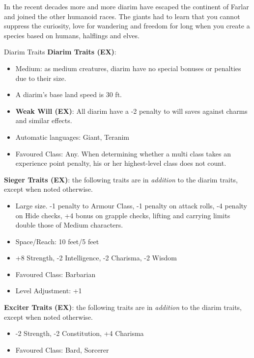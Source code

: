 In the recent decades more and more diarim have escaped the continent of
Farlar and joined the other humanoid races. The giants had to learn that you
cannot suppress the curiosity, love for wandering and freedom for long when
you create a species based on humans, halflings and elves.

\begin{35e}{Diarim Traits}
  \textbf{Diarim Traits (EX)}:
  \begin{itemize}[noitemsep]
    \item Medium: as medium creatures, diarim have no special bonuses or
    penalties due to their size.
    \item A diarim's base land speed is 30 ft.
    \item \textbf{Weak Will (EX)}: All diarim have a -2 penalty to will
    saves against charms and similar effects.
    \item Automatic languages: Giant, Teranim
    \item Favoured Class: Any. When determining whether a multi class takes an
    experience point penalty, his or her highest-level class does not count.
  \end{itemize}

  \textbf{Sieger Traits (EX)}: the following traits are in \emph{addition} to
  the diarim traits, except when noted otherwise.
  \begin{itemize}[noitemsep]
    \item Large size. -1 penalty to Armour Class, -1 penalty on attack rolls,
    -4 penalty on Hide checks, +4 bonus on grapple checks, lifting and
    carrying limits double those of Medium characters.
    \item Space/Reach: 10 feet/5 feet
    \item +8 Strength, -2 Intelligence, -2 Charisma, -2 Wisdom
    \item Favoured Class: Barbarian
    \item Level Adjustment: +1
  \end{itemize}

  \textbf{Exciter Traits (EX)}: the following traits are in \emph{addition} to
  the diarim traits, except when noted otherwise.
  \begin{itemize}[noitemsep]
    \item -2 Strength, -2 Constitution, +4 Charisma
    \item Favoured Class: Bard, Sorcerer
  \end{itemize}
\end{35e}
